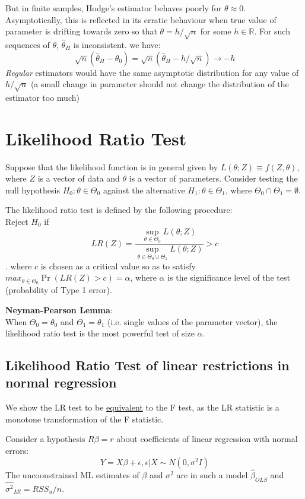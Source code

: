 \documentclass[DIV=14,titlepage=false]{scrreprt}
\begin{document}
But in finite samples, Hodge's estimator behaves poorly for \(\theta\approx 0\). Asymptotically, this is reflected in its erratic behaviour when true value of parameter is drifting towards zero
so that \(\theta=h/\sqrt{n}\) for some \(h\in\mathbb{R}\). For such sequences of \(\theta\), \(\hat{\theta}_{H}\) is inconsistent. we have:
\[\sqrt{n}(\hat{\theta}_H-\theta_0)=\sqrt{n}(\hat{\theta}_H-h/\sqrt{n})\rightarrow -h\]
\textit{Regular} estimators would have the same asymptotic distribution for any value of \(h/\sqrt{n}\) (a small change in parameter should not change the distribution of the estimator too much)

\section{Likelihood Ratio Test}
Suppose that the likelihood function is in general given by \(L(\theta;Z) \equiv f(Z,\theta)\), where \(Z\) is a vector of data and \(\theta\) is a vector of parameters.
Consider testing the null hypothesis \(H_0:\theta\in\Theta_0\) against the alternative \(H_1:\theta\in\Theta_1\), where \(\Theta_0\cap\Theta_1=\emptyset\).

The likelihood ratio test is defined by the following procedure:
\\ Reject \(H_0\) if \[LR(Z)=\frac{\sup_{\theta\in\Theta_0}L(\theta;Z)}{\sup_{\theta\in\Theta_0 \cup \Theta_1}L(\theta;Z)}> c\].
where \(c\) is chosen as a critical value so as to satisfy \(max_{\theta\in\Theta_0}\Pr(LR(Z)>c)=\alpha\), where \(\alpha\) is the significance level of the test (probability of Type 1 error).
\vspace{5mm}
\begin{theorem} \textbf{Neyman-Pearson Lemma}:
\\ When \(\Theta_0=\theta_0\) and \(\Theta_1=\theta_1\) (i.e. single values of the parameter vector), the likelihood ratio test is the most powerful test of size \(\alpha\).
\end{theorem}
\vspace{5mm}
\subsection{Likelihood Ratio Test of linear restrictions in normal regression}
\vspace{5mm}
\begin{prop}
    We show the LR test to be \underline{equivalent} to the F test, as the LR statistic is a monotone transformation of the F statistic.
\end{prop}
Consider a hypothesis \(R\beta=r\) about coefficients of linear regression with normal errors:
\[Y=X\beta+\epsilon, \epsilon|X\sim N(0,\sigma^2I)\]
The uncoonstrained ML estimates of \(\beta\) and \(\sigma^2\) are in such a model \(\hat{\beta}_{OLS}\) and \(\hat{\sigma^2}_{Ml}=RSS_u/n\).
\end{document}
